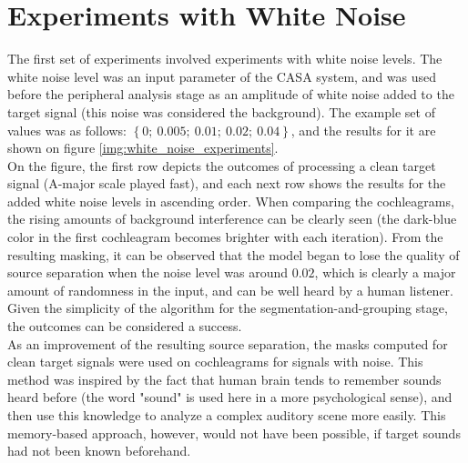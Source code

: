 \section{Experiments with White Noise}

The first set of experiments involved experiments with white noise levels. The white noise level was an input parameter of the CASA system, and was used before the peripheral analysis stage as an amplitude of white noise added to the target signal (this noise was considered the background). The example set of values was as follows: $\left\{0;~0.005;~0.01;~0.02;~0.04\right\}$, and the results for it are shown on figure \ref{img:white_noise_experiments}.\\

On the figure, the first row depicts the outcomes of processing a clean target signal (A-major scale played fast), and each next row shows the results for the added white noise levels in ascending order. When comparing the cochleagrams, the rising amounts of background interference can be clearly seen (the dark-blue color in the first cochleagram becomes brighter with each itera\-tion). From the resulting masking, it can be observed that the model began to lose the quality of source separation when the noise level was around $0.02$, which is clearly a major amount of randomness in the input, and can be well heard by a human listener. Given the simplicity of the algorithm for the segmentation-and-grouping stage, the outcomes can be considered a success.\\

As an improvement of the resulting source separation, the masks computed for clean target signals were used on cochleagrams for signals with noise. This method was inspired by the fact that human brain tends to remember sounds heard before (the word "sound" is used here in a more psychological sense), and then use this knowledge to analyze a complex auditory scene more easily. This memory-based approach, however, would not have been possible, if target sounds had not been known beforehand.

